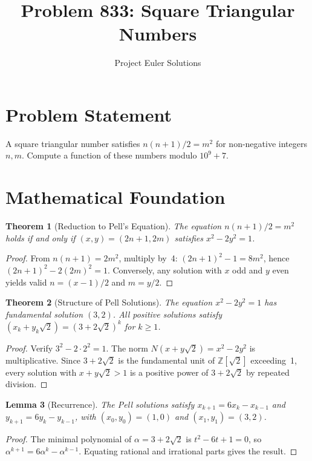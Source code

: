 \documentclass[11pt]{article}
\title{Problem 833: Square Triangular Numbers}
\author{Project Euler Solutions}
\date{}
\newtheorem{theorem}{Theorem}
\newtheorem{lemma}[theorem]{Lemma}
\begin{document}
\maketitle

\section{Problem Statement}

A square triangular number satisfies $n(n+1)/2 = m^2$ for non-negative integers $n,m$. Compute a function of these numbers modulo $10^9+7$.

\section{Mathematical Foundation}

\begin{theorem}[Reduction to Pell's Equation]
The equation $n(n+1)/2 = m^2$ holds if and only if $(x,y)=(2n+1,2m)$ satisfies $x^2 - 2y^2 = 1$.
\end{theorem}

\begin{proof}
From $n(n+1)=2m^2$, multiply by~4: $(2n+1)^2-1=8m^2$, hence $(2n+1)^2-2(2m)^2=1$. Conversely, any solution with $x$ odd and $y$ even yields valid $n=(x-1)/2$ and $m=y/2$.
\end{proof}

\begin{theorem}[Structure of Pell Solutions]
The equation $x^2-2y^2=1$ has fundamental solution $(3,2)$. All positive solutions satisfy $(x_k+y_k\sqrt{2})=(3+2\sqrt{2})^k$ for $k\ge 1$.
\end{theorem}

\begin{proof}
Verify $3^2-2\cdot 2^2=1$. The norm $N(x+y\sqrt{2})=x^2-2y^2$ is multiplicative. Since $3+2\sqrt{2}$ is the fundamental unit of $\mathbb{Z}[\sqrt{2}]$ exceeding~1, every solution with $x+y\sqrt{2}>1$ is a positive power of $3+2\sqrt{2}$ by repeated division.
\end{proof}

\begin{lemma}[Recurrence]
The Pell solutions satisfy $x_{k+1}=6x_k-x_{k-1}$ and $y_{k+1}=6y_k-y_{k-1}$, with $(x_0,y_0)=(1,0)$ and $(x_1,y_1)=(3,2)$.
\end{lemma}

\begin{proof}
The minimal polynomial of $\alpha=3+2\sqrt{2}$ is $t^2-6t+1=0$, so $\alpha^{k+1}=6\alpha^k-\alpha^{k-1}$. Equating rational and irrational parts gives the result.
\end{proof}
\end{document}
